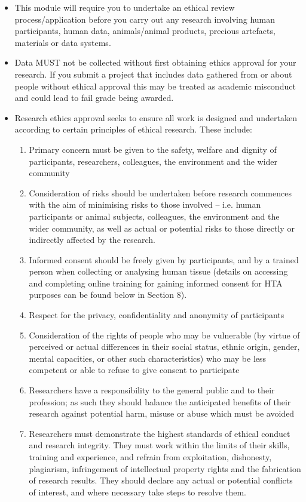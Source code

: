 \documentclass{MDXHandbook}
\begin{document}
\begin{itemize}
	\item This module will require you to undertake an ethical review process/application before you carry out any research involving human participants, human data, animals/animal products, precious artefacts, materials or data systems.
	\item Data MUST not be collected without first obtaining ethics approval for your research. If you submit a project that includes data gathered from or about people without ethical approval this may be treated as academic misconduct and could lead to fail grade being awarded.
	\item Research ethics approval seeks to ensure all work is designed and undertaken according to certain principles of ethical research. These include: 
		\begin{enumerate}
			\item Primary concern must be given to the safety, welfare and dignity of participants, researchers, colleagues, the environment and the wider community 
			\item Consideration of risks should be undertaken before research commences with the aim of minimising risks to those involved – i.e. human participants or animal subjects, colleagues, the environment and the wider community, as well as actual or potential risks to those directly or indirectly affected by the research.
			\item Informed consent should be freely given by participants, and by a trained person when collecting or analysing human tissue (details on accessing and completing online training for gaining informed consent for HTA purposes can be found below in Section 8).
			\item Respect for the privacy, confidentiality and anonymity of participants 
			\item Consideration of the rights of people who may be vulnerable (by virtue of perceived or actual differences in their social status, ethnic origin, gender, mental capacities, or other such characteristics) who may be less competent or able to refuse to give consent to participate
			\item Researchers have a responsibility to the general public and to their profession; as such they should balance the anticipated benefits of their research against potential harm, misuse or abuse which must be avoided 
			\item Researchers must demonstrate the highest standards of ethical conduct and research integrity. They must work within the limits of their skills, training and experience, and refrain from exploitation, dishonesty, plagiarism, infringement of intellectual property rights and the fabrication of research results. They should declare any actual or potential conflicts of interest, and where necessary take steps to resolve them. 

\end{enumerate}
\end{itemize}
\end{document}
